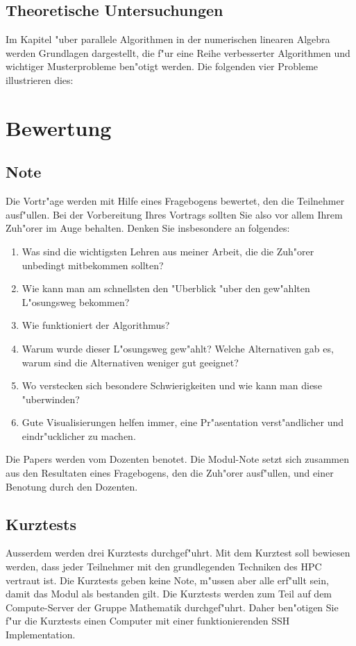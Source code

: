 \documentclass[a4paper,12pt]{article}
\begin{document}
\subsection{Theoretische Untersuchungen}
Im Kapitel "uber parallele Algorithmen in der numerischen linearen
Algebra werden Grundlagen dargestellt, die f"ur eine Reihe 
verbesserter Algorithmen und wichtiger Musterprobleme ben"otigt werden.
Die folgenden vier Probleme illustrieren dies:





\section{Bewertung}
\subsection{Note}
Die Vortr"age werden mit Hilfe eines Fragebogens bewertet,
den die Teilnehmer ausf"ullen.
Bei der Vorbereitung Ihres Vortrags sollten Sie also vor allem
Ihrem Zuh"orer im Auge behalten.
Denken Sie insbesondere an folgendes:
\begin{enumerate}
\item Was sind die wichtigsten Lehren aus meiner Arbeit, die die
Zuh"orer unbedingt mitbekommen sollten?
\item Wie kann man am schnellsten den "Uberblick "uber den
gew"ahlten L"osungsweg bekommen?
\item Wie funktioniert der Algorithmus? 
\item Warum wurde dieser L"osungsweg gew"ahlt? Welche Alternativen
gab es, warum sind die Alternativen weniger gut geeignet?
\item Wo verstecken sich besondere Schwierigkeiten und wie kann
man diese "uberwinden?
\item Gute Visualisierungen helfen immer, eine Pr"asentation
verst"andlicher und eindr"ucklicher zu machen.
\end{enumerate}

Die Papers werden vom Dozenten benotet.
Die Modul-Note setzt sich zusammen aus den Resultaten eines Fragebogens,
den die Zuh"orer ausf"ullen, und einer Benotung durch den Dozenten.

\subsection{Kurztests}
Ausserdem werden drei Kurztests durchgef"uhrt.
Mit dem Kurztest
soll bewiesen werden, dass jeder Teilnehmer mit den grundlegenden
Techniken des HPC vertraut ist.
Die Kurztests geben keine Note, m"ussen aber alle erf"ullt sein,
damit das Modul als bestanden gilt.
Die Kurztests werden zum Teil auf dem Compute-Server der 
Gruppe Mathematik durchgef"uhrt.
Daher ben"otigen Sie f"ur die Kurztests einen Computer mit einer
funktionierenden SSH Implementation.
\end{document}
